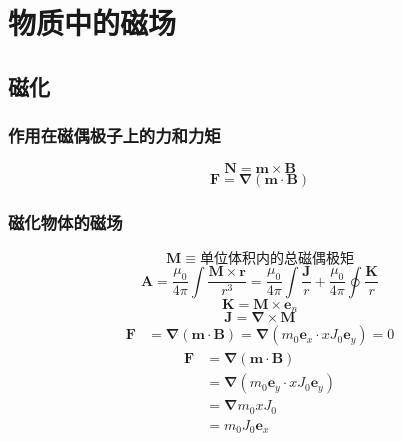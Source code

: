 \cleardoublepage

\section{物质中的磁场}
\subsection{磁化}
\subsubsection{作用在磁偶极子上的力和力矩}
\begin{equation}
    \boldsymbol{N}=\boldsymbol{m}\times\boldsymbol{B}
\end{equation}
\begin{equation}
    \boldsymbol{F}=\boldsymbol{\nabla}\left(\boldsymbol{m}\cdot\boldsymbol{B}\right)
\end{equation}
\subsubsection{磁化物体的磁场}
\begin{equation}
    \boldsymbol{M}\equiv\text{单位体积内的总磁偶极矩}
\end{equation}
\begin{equation}
    \boldsymbol{A}=\frac{\mu_0}{4\pi}\int\frac{\boldsymbol{M}\times\boldsymbol{r}}{r^3}=\frac{\mu_0}{4\pi}\int\frac{\boldsymbol{J}}{r}
    +\frac{\mu_0}{4\pi}\oint\frac{\boldsymbol{K}}{r}
\end{equation}
\begin{equation}
    \boldsymbol{K}=\boldsymbol{M}\times\boldsymbol{e}_n
\end{equation}
\begin{equation}
    \boldsymbol{J}=\boldsymbol{\nabla}\times\boldsymbol{M}
\end{equation}
\begin{align*}
    \boldsymbol{F}&=\boldsymbol{\nabla}\left(\boldsymbol{m}\cdot\boldsymbol{B}\right)=\boldsymbol{\nabla}\left(m_0\boldsymbol{e}_x\cdot xJ_0\boldsymbol{e}_y\right)=0
\end{align*}
\begin{align*}
    \boldsymbol{F}&=\boldsymbol{\nabla}\left(\boldsymbol{m}\cdot\boldsymbol{B}\right)\\
    &=\boldsymbol{\nabla}\left(m_0\boldsymbol{e}_y\cdot xJ_0\boldsymbol{e}_y\right)\\
    &=\boldsymbol{\nabla}m_0xJ_0\\
    &=m_0J_0\boldsymbol{e}_x
\end{align*}
